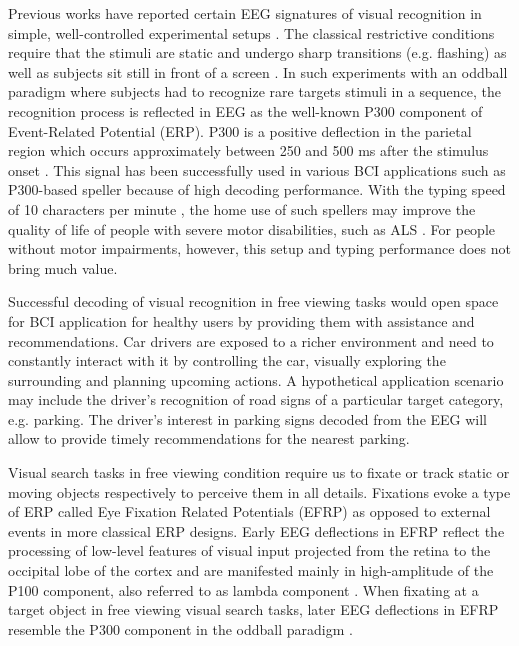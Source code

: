 \documentclass[12pt]{iopart}
\begin{document}
Previous works have reported certain EEG signatures of visual recognition in simple, well-controlled experimental setups
\cite{gerson_cortically_2006,krusienski_toward_2008,rosenthal_evoked_2014,jangraw_neurally_2014}.
The classical restrictive conditions require that
the stimuli are static and undergo sharp
transitions (e.g. flashing) as well as 
subjects sit still in front of a screen \cite{krusienski_toward_2008}. 
In such experiments with an oddball paradigm 
where subjects had to recognize
rare targets stimuli in a sequence, the recognition process
is reflected in EEG as the well-known P300 component of Event-Related Potential (ERP).
P300 is a positive deflection in the parietal region which occurs
approximately between 250 and 500 ms after the stimulus onset \cite{polich_updating_2007}.
This signal has been successfully used in various BCI applications such as
P300-based speller because of high decoding performance.
With the typing speed of 10 characters per minute \cite{rezeika_braincomputer_2018},
the home use of such spellers may improve the quality of life
of people with severe motor disabilities, such as ALS
\cite{sellers_brain-computer_2010,holz_long-term_2015,wolpaw_independent_2018}.
For people without motor impairments, however, this setup and typing performance does not bring much value.

Successful decoding of visual recognition in free viewing tasks
would open space for BCI application for healthy users
by providing them with assistance and recommendations.
Car drivers are exposed to a richer environment and need to constantly interact with it
by controlling the car, visually exploring the surrounding and
planning upcoming actions. 
A hypothetical application scenario may include
the driver's recognition of road signs of a particular target category, e.g. parking.
The driver's interest in parking signs decoded from the EEG
will allow to provide timely recommendations for the nearest parking.

Visual search tasks in free viewing condition require us to fixate or track static or moving objects respectively to perceive them in all details. Fixations evoke a type of ERP called Eye Fixation Related Potentials (EFRP)
as opposed to external events in more classical ERP designs.
Early EEG deflections in EFRP reflect the processing of low-level features 
of visual input projected from the retina to the occipital lobe of the cortex
and are manifested mainly in high-amplitude 
of the P100 component, also referred to as lambda component \cite{evans_further_1952}.
When fixating at a target object in free viewing visual search tasks, later EEG deflections in EFRP resemble the P300 component in the oddball paradigm \cite{brouwer_distinguishing_2013,kaunitz_looking_2014,devillez_eye_2015}.
\end{document}
